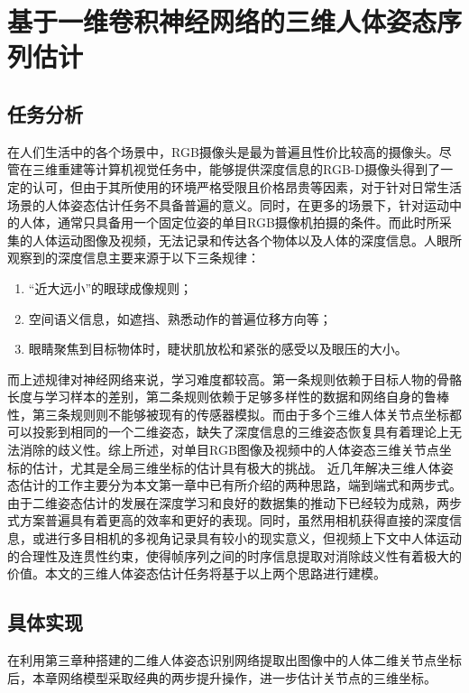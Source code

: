 
\chapter{基于一维卷积神经网络的三维人体姿态序列估计}


\section{任务分析}
\esection{}

在人们生活中的各个场景中，RGB摄像头是最为普遍且性价比较高的摄像头。尽管在三维重建等计算机视觉任务中，能够提供深度信息的RGB-D摄像头得到了一定的认可，但由于其所使用的环境严格受限且价格昂贵等因素，对于针对日常生活场景的人体姿态估计任务不具备普遍的意义。同时，在更多的场景下，针对运动中的人体，通常只具备用一个固定位姿的单目RGB摄像机拍摄的条件。而此时所采集的人体运动图像及视频，无法记录和传达各个物体以及人体的深度信息。人眼所观察到的深度信息主要来源于以下三条规律：

\begin{enumerate}
    \item “近大远小”的眼球成像规则；
    \item 空间语义信息，如遮挡、熟悉动作的普遍位移方向等；
    \item 眼睛聚焦到目标物体时，睫状肌放松和紧张的感受以及眼压的大小。
\end{enumerate}

而上述规律对神经网络来说，学习难度都较高。第一条规则依赖于目标人物的骨骼长度与学习样本的差别，第二条规则依赖于足够多样性的数据和网络自身的鲁棒性，第三条规则则不能够被现有的传感器模拟。而由于多个三维人体关节点坐标都可以投影到相同的一个二维姿态，缺失了深度信息的三维姿态恢复具有着理论上无法消除的歧义性。综上所述，对单目RGB图像及视频中的人体姿态三维关节点坐标的估计，尤其是全局三维坐标的估计具有极大的挑战。
近几年解决三维人体姿态估计的工作主要分为本文第一章中已有所介绍的两种思路，端到端式和两步式。由于二维姿态估计的发展在深度学习和良好的数据集的推动下已经较为成熟，两步式方案普遍具有着更高的效率和更好的表现。同时，虽然用相机获得直接的深度信息，或进行多目相机的多视角记录具有较小的现实意义，但视频上下文中人体运动的合理性及连贯性约束，使得帧序列之间的时序信息提取对消除歧义性有着极大的价值。本文的三维人体姿态估计任务将基于以上两个思路进行建模。


\section{具体实现}
\esection{}

在利用第三章种搭建的二维人体姿态识别网络提取出图像中的人体二维关节点坐标后，本章网络模型采取经典的两步提升操作，进一步估计关节点的三维坐标。

